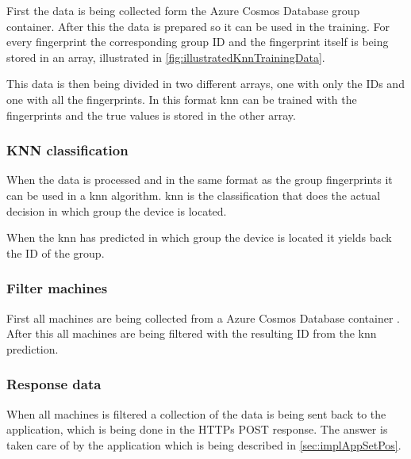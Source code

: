 \bigskip

First the data is being collected form the Azure Cosmos Database \cite{IntroductionAzureCosmos} group container. 
After this the data is prepared so it can be used in the training.
For every fingerprint the corresponding group ID and the fingerprint itself is being stored in an array, illustrated in \cref{fig:illustratedKnnTrainingData}.


This data is then being divided in two different arrays, one with only the IDs and one with all the fingerprints.
In this format \acrshort{knn} can be trained with the fingerprints and the true values is stored in the other array.


\subsubsection{KNN classification}\label{sec:implServerSetPosKnnClassification}
When the data is processed and in the same format as the group fingerprints it can be used in a \acrshort{knn} algorithm.
\acrshort{knn} is the classification that does the actual decision in which group the device is located.

\bigskip

When the \acrshort{knn} has predicted in which group the device is located it yields back the ID of the group. 

\subsubsection{Filter machines}\label{sec:implServerSetPosFilterMachines}
First all machines are being collected from a Azure Cosmos Database container \cite{IntroductionAzureCosmos}.
After this all machines are being filtered with the resulting ID from the \acrshort{knn} prediction.

\subsubsection{Response data}\label{sec:implServerSetPosResponse}
When all machines is filtered a collection of the data is being sent back to the application, which is being done in the HTTPs POST response.
The answer is taken care of by the application which is being described in \cref{sec:implAppSetPos}.

